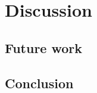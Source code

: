\documentclass[11pt,a4paper]{article}
\begin{document}
\section{Discussion}
\subsection{Future work}
\subsection{Conclusion}

\pagebreak
\printbibliography{}
\end{document}
